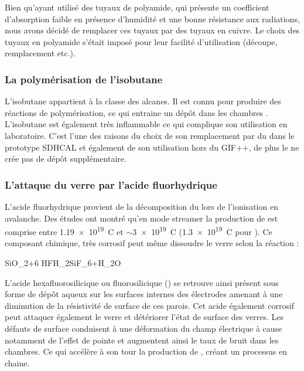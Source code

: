 Bien qu'ayant utilisé des tuyaux de polyamide, qui présente un coefficient d'absorption faible en présence d'humidité et une bonne résistance aux radiations, nous avons décidé de remplacer ces tuyaux par des tuyaux en cuivre. Le choix des tuyaux en polyamide s'était imposé pour leur facilité d'utilisation (découpe, remplacement etc.). 

\subsubsection{La polymérisation de l'isobutane}
 L'isobutane  appartient à la classe des alcanes. Il est connu pour produire des réactions de polymérisation, ce qui entraine un dépôt dans les chambres \cite{na60}. L'isobutane est également très inflammable ce qui complique son utilisation en laboratoire. C'est l'une des raisons du choix de son remplacement par du  dans le prototype SDHCAL et également de son utilisation hors du GIF++, de plus le  ne crée pas de dépôt supplémentaire.

\subsubsection{L'attaque du verre par l'acide fluorhydrique \texorpdfstring{}{HF}}
L'acide fluorhydrique  provient de la décomposition du  lors de l'ionisation en avalanche. Des études ont montré qu'en mode streamer la production de  est comprise entre \num{1.19e19}\si{\per\coulomb} \cite{Lu:2009zzd} et $\sim$\num{3e19}\si{\per\coulomb} \cite{Abbrescia:2006hk} (\num{1.3e19}\si{\per\coulomb} pour \cite{Aielli:2006ih}). Ce composant chimique, très corrosif peut même dissoudre le verre selon la réaction :
\begin{chemeqn}
SiO_2+6 HF\longrightarrow H_2SiF_6+H_2O
\end{chemeqn}
L'acide hexafluorosilicique ou fluorosilicique () se retrouve ainsi présent sous forme de dépôt aqueux sur les surfaces internes des électrodes amenant à une diminution de la résistivité de surface de ces parois. Cet acide également corrosif peut attaquer également le verre et détériorer l'état de surface des verres. Les défauts de surface conduisent à une déformation du champ électrique à cause notamment de l'effet de pointe et augmentent ainsi le taux de bruit dans les chambres. Ce qui accélère à son tour la production de , créant un processus en chaine.

